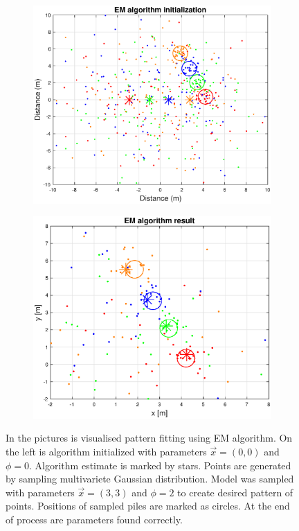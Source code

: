 \begin{figure}[H]
	\centering
	\begin{subfigure}{0.49\textwidth}
		\centering
		\includegraphics[scale=0.43]{fig/em_init.eps}
	\end{subfigure}
	\begin{subfigure}{.49\textwidth}
		\centering
		\includegraphics[scale=0.43]{fig/em_result.eps}

	\end{subfigure}
	
	\caption[EM pattern fitting]{In the pictures is visualised pattern fitting using EM algorithm. On the left is algorithm initialized with parameters $\vec{x}=(0, 0)$ and $\phi=0$. Algorithm estimate is marked by stars. Points are generated by sampling multivariete Gaussian distribution. Model was sampled with parameters $\vec{x}=(3, 3)$ and $\phi=2$ to create desired pattern of points. Positions of sampled piles are marked as circles. At the end of process are parameters found correctly.}
	\label{fig:em_pattern}
\end{figure}

